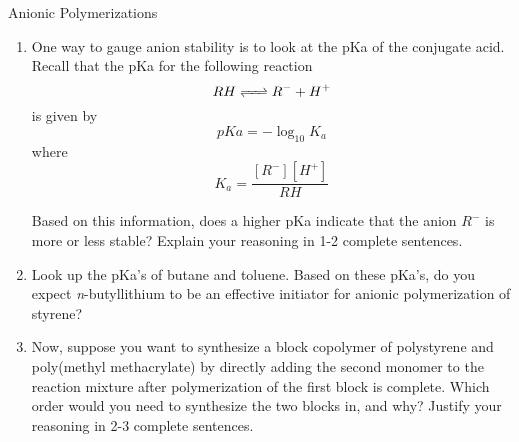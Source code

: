 \begin{activity}{Anionic Polymerizations}
\begin{exercises}
\begin{enumerate}
			\item One way to gauge anion stability is to look at the pKa of the conjugate acid.  Recall that the pKa for the following reaction
					\begin{equation*}
						RH \ce{<=>} R^- + H^+
					\end{equation*}
				is given by 
					\begin{equation*}
						pKa = -\log_{10} K_a
					\end{equation*}
				where
					\begin{equation*}
						K_a = \frac{[R^-][H^+]}{RH}
					\end{equation*}
					
					Based on this information, does a higher pKa indicate that the anion $R^-$ is more or less stable?  Explain your reasoning in 1-2 complete sentences.
					
				\begin{solution}\end{solution}
				
			\item Look up the pKa's of butane and toluene.  Based on these pKa's, do you expect \emph{n}-butyllithium to be an effective initiator for anionic polymerization of styrene?
			
				\begin{solution}\end{solution}
				
			
			\item Now, suppose you want to synthesize a block copolymer of polystyrene and poly(methyl methacrylate) by directly adding the second monomer to the reaction mixture after polymerization of the first block is complete.  Which order would you need to synthesize the two blocks in, and why?  Justify your reasoning in 2-3 complete sentences.
			

\end{enumerate}
\end{exercises}
\end{activity}
